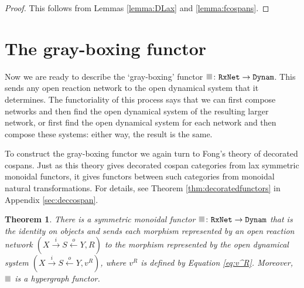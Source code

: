 \documentclass{compositionalityarticle}
\newcommand{\RxNet}{\mathtt{RxNet}}
\newcommand{\Dynam}{\mathtt{Dynam}}
\newcommand*{\graysquare}{\textcolor{lightgray}{\blacksquare}}
\newcommand{\maps}{\colon}
\theoremstyle{compositionality}
\newtheorem{thm}{Theorem}
\theoremstyle{remark}
\begin{document}
\begin{proof}
This follows from Lemmas \ref{lemma:DLax} and \ref{lemma:fcospans}.
\end{proof}

\section{The gray-boxing functor}
\label{sec:gray}

Now we are ready to describe the `gray-boxing' functor $\graysquare \maps \RxNet \to \Dynam$.  This sends any open reaction network to the open dynamical system that it determines.  The functoriality of this process says that we can first compose networks and then find the open dynamical system of the resulting larger network, or first find the open dynamical system for each network and then compose these systems: either way, the result is the same.

To construct the gray-boxing functor we again turn to Fong's theory of decorated
cospans.  Just as this theory gives decorated cospan categories from lax symmetric 
monoidal functors, it gives functors between such categories from monoidal natural transformations.  For details, see Theorem \ref{thm:decoratedfunctors} in Appendix \ref{sec:deccospan}.

\begin{thm}
There is a symmetric monoidal functor $\graysquare \maps \RxNet \to \Dynam$ that is
the identity on objects and sends each morphism represented by an open reaction network $( X \stackrel{i}{\to} S \stackrel{o}{\leftarrow} Y , R )$ to the morphism represented by the open dynamical system $( X \stackrel{i}{\to} S \stackrel{o}{\leftarrow} Y , v^R )$, where $v^R$ is defined by Equation \ref{eq:v^R}.  Moreover, $\graysquare$ is a hypergraph functor.
\end{thm}
\end{document}
